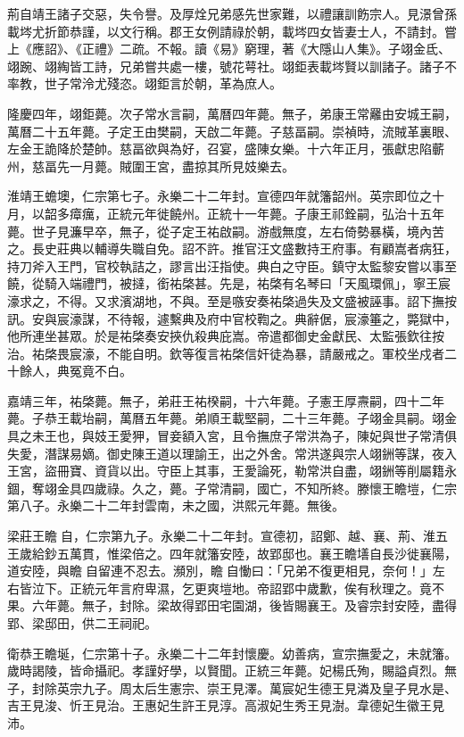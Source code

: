 荊自靖王諸子交惡，失令譽。及厚烇兄弟感先世家難，以禮讓訓飭宗人。見澋曾孫載埁尤折節恭謹，以文行稱。郡王女例請祿於朝，載埁四女皆妻士人，不請封。嘗上《應詔》、《正禮》二疏。不報。讀《易》窮理，著《大隱山人集》。子翊金氐、翊踠、翊綯皆工詩，兄弟嘗共處一樓，號花萼社。翊鉅表載埁賢以訓諸子。諸子不率教，世子常泠尤殘恣。翊鉅言於朝，革為庶人。

隆慶四年，翊鉅薨。次子常水言嗣，萬曆四年薨。無子，弟康王常䍦由安城王嗣，萬曆二十五年薨。子定王由樊嗣，天啟二年薨。子慈畐嗣。崇禎時，流賊革裏眼、左金王詭降於楚帥。慈畐欲與為好，召宴，盛陳女樂。十六年正月，張獻忠陷蘄州，慈畐先一月薨。賊圍王宮，盡掠其所見妓樂去。

淮靖王蟾墺，仁宗第七子。永樂二十二年封。宣德四年就籓韶州。英宗即位之十月，以韶多瘴癘，正統元年徙饒州。正統十一年薨。子康王祁銓嗣，弘治十五年薨。世子見濂早卒，無子，從子定王祐啟嗣。游戲無度，左右倚勢暴橫，境內苦之。長史莊典以輔導失職自免。詔不許。推官汪文盛數持王府事。有顧嵩者病狂，持刀斧入王門，官校執詰之，謬言出汪指使。典白之守臣。鎮守太監黎安嘗以事至饒，從騎入端禮門，被撻，銜祐棨甚。先是，祐棨有名琴曰「天風環佩」，寧王宸濠求之，不得。又求濱湖地，不與。至是嗾安奏祐棨過失及文盛被誣事。詔下撫按訊。安與宸濠謀，不待報，遽繫典及府中官校鞫之。典辭倨，宸濠箠之，斃獄中，他所連坐甚眾。於是祐棨奏安挾仇殺典庇嵩。帝遣都御史金獻民、太監張欽往按治。祐棨畏宸濠，不能自明。欽等復言祐棨信奸徒為暴，請嚴戒之。軍校坐戍者二十餘人，典冤竟不白。

嘉靖三年，祐棨薨。無子，弟莊王祐楑嗣，十六年薨。子憲王厚燾嗣，四十二年薨。子恭王載坮嗣，萬曆五年薨。弟順王載堅嗣，二十三年薨。子翊金具嗣。翊金具之未王也，與妓王愛狎，冒妾額入宮，且令撫庶子常洪為子，陳妃與世子常清俱失愛，潛謀易嫡。御史陳王道以理諭王，出之外舍。常洪遂與宗人翊銂等謀，夜入王宮，盜冊寶、資貨以出。守臣上其事，王愛論死，勒常洪自盡，翊銂等削屬籍永錮，奪翊金具四歲祿。久之，薨。子常清嗣，國亡，不知所終。滕懷王瞻塏，仁宗第八子。永樂二十二年封雲南，未之國，洪熙元年薨。無後。

梁莊王瞻自，仁宗第九子。永樂二十二年封。宣德初，詔鄭、越、襄、荊、淮五王歲給鈔五萬貫，惟梁倍之。四年就籓安陸，故郢邸也。襄王瞻墡自長沙徙襄陽，道安陸，與瞻自留連不忍去。瀕別，瞻自慟曰：「兄弟不復更相見，奈何！」左右皆泣下。正統元年言府卑濕，乞更爽塏地。帝詔郢中歲歉，俟有秋理之。竟不果。六年薨。無子，封除。梁故得郢田宅園湖，後皆賜襄王。及睿宗封安陸，盡得郢、梁邸田，供二王祠祀。

衛恭王瞻埏，仁宗第十子。永樂二十二年封懷慶。幼善病，宣宗撫愛之，未就籓。歲時謁陵，皆命攝祀。孝謹好學，以賢聞。正統三年薨。妃楊氏殉，賜謚貞烈。無子，封除英宗九子。周太后生憲宗、崇王見澤。萬宸妃生德王見潾及皇子見水是、吉王見浚、忻王見治。王惠妃生許王見淳。高淑妃生秀王見澍。韋德妃生徽王見沛。

